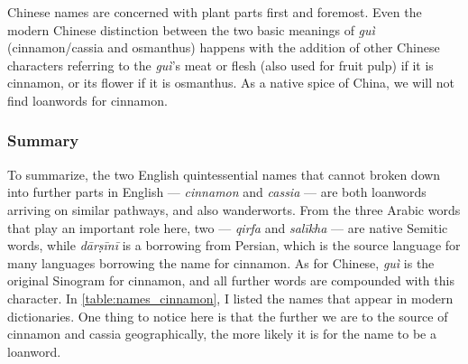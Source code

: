 



Chinese names are concerned with plant parts first and foremost. Even the modern Chinese distinction between the two basic meanings of \textit{guì} (cinnamon/cassia and osmanthus) happens with the addition of other Chinese characters referring to the \textit{guì}'s meat or flesh (also used for fruit pulp) if it is cinnamon, or its flower if it is osmanthus. As a native spice of China, we will not find loanwords for cinnamon.

\subsubsection{Summary}



To summarize, the two English quintessential names that cannot broken down into further parts in English --- \textit{cinnamon} and \textit{cassia} --- are both loanwords arriving on similar pathways, and also \glspl{wanderwort}. From the three Arabic words that play an important role here, two --- \textit{qirfa} and \textit{salīkha} --- are native Semitic words, while \textit{dārṣīnī} is a borrowing from Persian, which is the source language for many languages borrowing the name for cinnamon. As for Chinese, \textit{guì} is the original Sinogram for cinnamon, and all further words are compounded with this character. In \cref{table:names_cinnamon}, I listed the names that appear in modern dictionaries. One thing to notice here is that the further we are to the source of cinnamon and cassia geographically, the more likely it is for the name to be a loanword.























